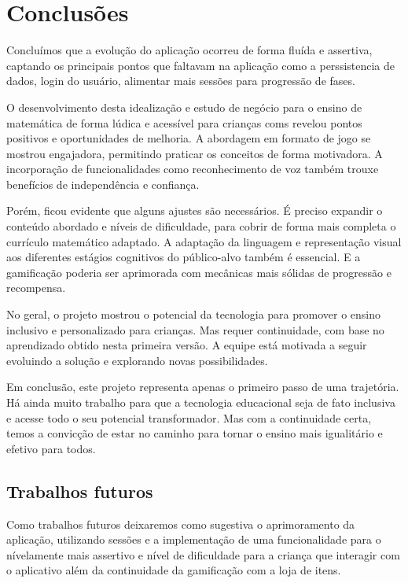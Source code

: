 \chapter{Conclusões}\label{chp:conc}

Concluímos que a evolução do aplicação ocorreu de forma fluída e assertiva, captando os principais pontos que faltavam na aplicação como a perssistencia de dados, login do usuário, alimentar mais sessões para progressão de fases. 

O desenvolvimento desta idealização e estudo de negócio para o ensino de matemática de forma lúdica e acessível para crianças coms revelou pontos positivos e oportunidades de melhoria. A abordagem em formato de jogo se mostrou engajadora, permitindo praticar os conceitos de forma motivadora. A incorporação de funcionalidades como reconhecimento de voz também trouxe benefícios de independência e confiança.

Porém, ficou evidente que alguns ajustes são necessários. É preciso expandir o conteúdo abordado e níveis de dificuldade, para cobrir de forma mais completa o currículo matemático adaptado. A adaptação da linguagem e representação visual aos diferentes estágios cognitivos do público-alvo também é essencial. E a gamificação poderia ser aprimorada com mecânicas mais sólidas de progressão e recompensa.

No geral, o projeto mostrou o potencial da tecnologia para promover o ensino inclusivo e personalizado para crianças. Mas requer continuidade, com base no aprendizado obtido nesta primeira versão. A equipe está motivada a seguir evoluindo a solução e explorando novas possibilidades.


Em conclusão, este projeto representa apenas o primeiro passo de uma trajetória. Há ainda muito trabalho para que a tecnologia educacional seja de fato inclusiva e acesse todo o seu potencial transformador. Mas com a continuidade certa, temos a convicção de estar no caminho para tornar o ensino mais igualitário e efetivo para todos.



\section{Trabalhos futuros}

Como trabalhos futuros deixaremos como sugestiva o aprimoramento da aplicação, utilizando sessões e a implementação  de uma funcionalidade para o nívelamente mais assertivo e nível de dificuldade para a criança que interagir com o aplicativo além da continuidade da gamificação com a loja de itens. 



